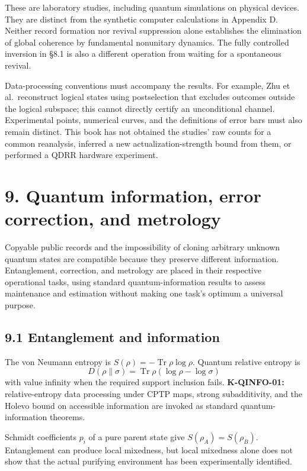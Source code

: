 \documentclass[
  11pt,
  oneside]{book}
\begin{document}
These are laboratory studies, including quantum simulations on physical
devices. They are distinct from the synthetic computer calculations in
Appendix D. Neither record formation nor revival suppression alone
establishes the elimination of global coherence by fundamental
nonunitary dynamics. The fully controlled inversion in §8.1 is also a
different operation from waiting for a spontaneous revival.

Data-processing conventions must accompany the results. For example, Zhu
et al.~reconstruct logical states using postselection that excludes
outcomes outside the logical subspace; this cannot directly certify an
unconditional channel. Experimental points, numerical curves, and the
definitions of error bars must also remain distinct. This book has not
obtained the studies' raw counts for a common reanalysis, inferred a new
actualization-strength bound from them, or performed a QDRR hardware
experiment.

\chapter{9. Quantum information, error correction, and
metrology}\label{ch-9}

Copyable public records and the impossibility of cloning arbitrary
unknown quantum states are compatible because they preserve different
information. Entanglement, correction, and metrology are placed in their
respective operational tasks, using standard quantum-information results
to assess maintenance and estimation without making one task's optimum a
universal purpose.

\section{9.1 Entanglement and information}

The von Neumann entropy is \(S(\rho)=-\operatorname{Tr}\rho\log\rho\).
Quantum relative entropy is \[
D(\rho\|\sigma)=\operatorname{Tr}\rho(\log\rho-\log\sigma)
\] with value infinity when the required support inclusion fails.
\textbf{K-QINFO-01:} relative-entropy data processing under CPTP maps,
strong subadditivity, and the Holevo bound on accessible information are
invoked as standard quantum-information theorems.

Schmidt coefficients \(p_i\) of a pure parent state give
\(S(\rho_A)=S(\rho_B)\). Entanglement can produce local mixedness, but
local mixedness alone does not show that the actual purifying
environment has been experimentally identified.
\end{document}
